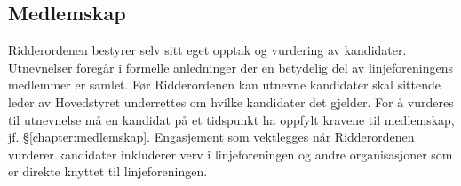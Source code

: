 \subsection{Medlemskap}{
Ridderordenen bestyrer selv sitt eget opptak og vurdering av kandidater. Utnevnelser foregår i formelle anledninger der en betydelig del av linjeforeningens medlemmer er samlet. Før Ridderordenen kan utnevne kandidater skal sittende leder av Hovedstyret underrettes om hvilke kandidater det gjelder. For å vurderes til utnevnelse må en kandidat på et tidspunkt ha oppfylt kravene til medlemskap, jf. §\ref{chapter:medlemskap}. Engasjement som vektlegges når Ridderordenen vurderer kandidater inkluderer verv i linjeforeningen og andre organisasjoner som er direkte knyttet til linjeforeningen.
}
